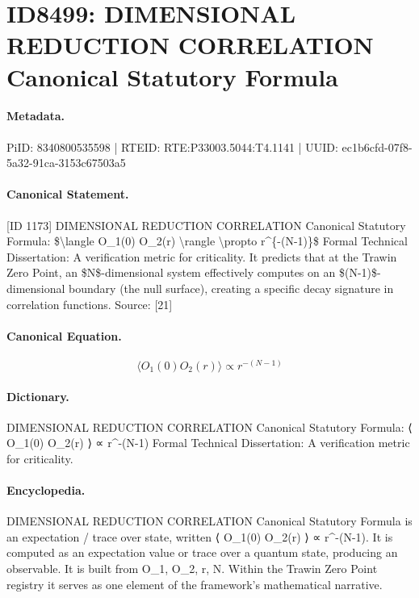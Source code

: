 \section*{ID8499: DIMENSIONAL REDUCTION CORRELATION Canonical Statutory Formula}
\paragraph{Metadata.}
PiID: 8340800535598 | RTEID: RTE:P33003.5044:T4.1141 | UUID: ec1b6cfd-07f8-5a32-91ca-3153c67503a5

\paragraph{Canonical Statement.}
[ID 1173] DIMENSIONAL REDUCTION CORRELATION Canonical Statutory Formula: \$\textbackslash{}langle O\_1(0) O\_2(r) \textbackslash{}rangle \textbackslash{}propto r\textasciicircum{}\{-(N-1)\}\$ Formal Technical Dissertation: A verification metric for criticality. It predicts that at the Trawin Zero Point, an \$N\$-dimensional system effectively computes on an \$(N-1)\$-dimensional boundary (the null surface), creating a specific decay signature in correlation functions. Source: [21]

\paragraph{Canonical Equation.}
\[
\langle O_1(0) O_2(r) \rangle \propto r^{-(N-1)}
\]

\paragraph{Dictionary.}
DIMENSIONAL REDUCTION CORRELATION Canonical Statutory Formula: ⟨ O\_1(0) O\_2(r) ⟩ ∝ r\textasciicircum{}-(N-1) Formal Technical Dissertation: A verification metric for criticality.

\paragraph{Encyclopedia.}
DIMENSIONAL REDUCTION CORRELATION Canonical Statutory Formula is an expectation / trace over state, written ⟨ O\_1(0) O\_2(r) ⟩ ∝ r\textasciicircum{}-(N-1). It is computed as an expectation value or trace over a quantum state, producing an observable. It is built from O\_1, O\_2, r, N. Within the Trawin Zero Point registry it serves as one element of the framework's mathematical narrative.

